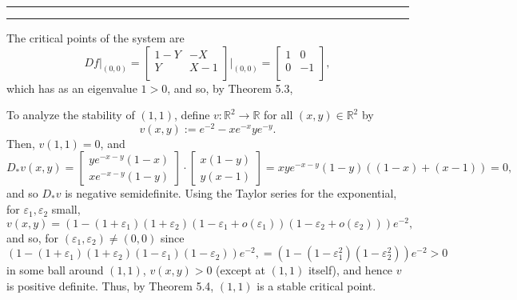 \documentclass[11pt]{article}
\newcounter{questionCounter}
\newcounter{partCounter}[questionCounter]
\newenvironment{question}[2][\arabic{questionCounter}]{%
    \setcounter{partCounter}{0}%
    \vspace{.25in} \hrule \vspace{0.5em}%
        \noindent{\bf #2}%
    \vspace{0.8em} \hrule \vspace{.10in}%
    \addtocounter{questionCounter}{1}%
}{}
\newcommand{\R}{\mathbb{R}} %
\newcommand{\e}{\varepsilon} %
\begin{document}
\begin{question}{Problem 4}
The critical points of the system are 
\[Df\big|_{(0,0)}
    =   \begin{bmatrix}
            1 - Y   & -X        \\
            Y       & X - 1     \\
        \end{bmatrix} \bigg|_{(0,0)}
    =   \begin{bmatrix}
            1   & 0     \\
            0   & -1    \\
        \end{bmatrix},
\]
which has as an eigenvalue $1 > 0$, and so, by Theorem 5.3, 

To analyze the stability of $(1,1)$, define $v : \R^2 \rightarrow \R$ for all
 $(x,y) \in \R^2$ by
\[v(x,y) := e^{-2} - xe^{-x}ye^{-y}.\]
Then, $v(1,1) = 0$, and
\[D_*v(x,y)
    =   \begin{bmatrix}
            ye^{-x - y}(1 - x) \\
            xe^{-x - y}(1 - y)
    \end{bmatrix}
  \cdot \begin{bmatrix}
            x(1 - y) \\
            y(x - 1)
        \end{bmatrix}
    =   xye^{-x - y}(1 - y)((1 - x) + (x - 1))
    =   0,
\]
and so $D_*v$ is negative semidefinite. Using the Taylor series for the
exponential, for $\e_1,\e_2$ small,
\[v(x,y)
    = (1 - (1 + \e_1)(1 + \e_2)(1 - \e_1 + o(\e_1))(1 - \e_2 + o(\e_2)))e^{-2},
\]
and so, for $(\e_1,\e_2) \neq (0,0)$ since
\[(1 - (1 + \e_1)(1 + \e_2)(1 - \e_1)(1 - \e_2))e^{-2},
    = (1 - (1 - \e_1^2)(1 - \e_2^2))e^{-2}
    > 0
\]
in some ball around $(1,1)$, $v(x,y) > 0$ (except at $(1,1)$ itself), and hence
$v$ is positive definite. Thus, by Theorem 5.4, $(1,1)$ is a stable critical
point.
\end{question}
\end{document}
